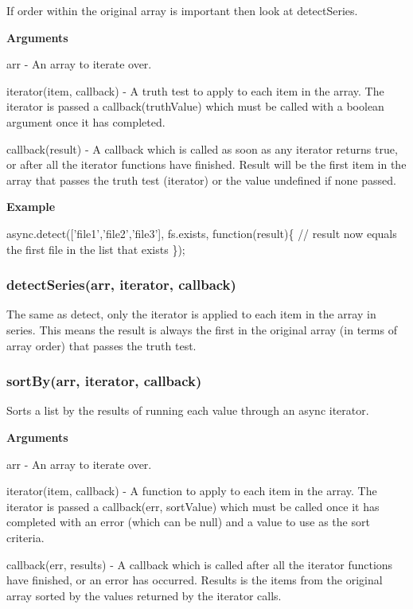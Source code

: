 If order within the original array is important then look at detect\+Series.

{\bfseries Arguments}


\begin{DoxyItemize}
\item arr -\/ An array to iterate over.
\item iterator(item, callback) -\/ A truth test to apply to each item in the array. The iterator is passed a callback(truth\+Value) which must be called with a boolean argument once it has completed.
\item callback(result) -\/ A callback which is called as soon as any iterator returns true, or after all the iterator functions have finished. Result will be the first item in the array that passes the truth test (iterator) or the value undefined if none passed.
\end{DoxyItemize}

{\bfseries Example}


\begin{DoxyCode}
async.detect([\textcolor{stringliteral}{'file1'},\textcolor{stringliteral}{'file2'},\textcolor{stringliteral}{'file3'}], fs.exists, \textcolor{keyword}{function}(result)\{
    \textcolor{comment}{// result now equals the first file in the list that exists}
\});
\end{DoxyCode}
 



\label{_detectSeries}%
 \subsubsection*{detect\+Series(arr, iterator, callback)}

The same as detect, only the iterator is applied to each item in the array in series. This means the result is always the first in the original array (in terms of array order) that passes the truth test.





\label{_sortBy}%
 \subsubsection*{sort\+By(arr, iterator, callback)}

Sorts a list by the results of running each value through an async iterator.

{\bfseries Arguments}


\begin{DoxyItemize}
\item arr -\/ An array to iterate over.
\item iterator(item, callback) -\/ A function to apply to each item in the array. The iterator is passed a callback(err, sort\+Value) which must be called once it has completed with an error (which can be null) and a value to use as the sort criteria.
\item callback(err, results) -\/ A callback which is called after all the iterator functions have finished, or an error has occurred. Results is the items from the original array sorted by the values returned by the iterator calls.
\end{DoxyItemize}

